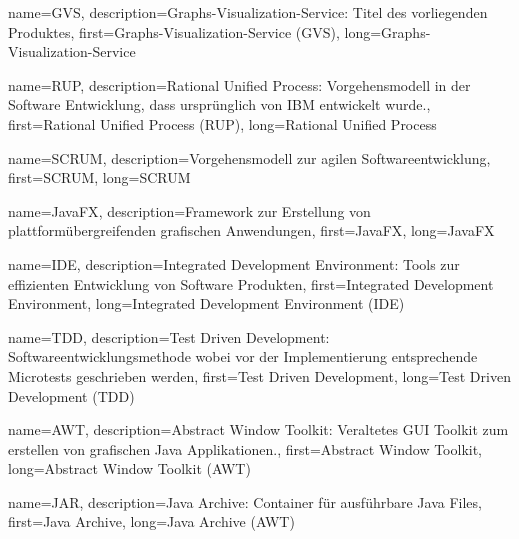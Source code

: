 



{
	name={GVS},
	description={Graphs-Visualization-Service: Titel des vorliegenden Produktes},
	first={Graphs-Visualization-Service (GVS)},
	long={Graphs-Visualization-Service}
}

{
	name={RUP},
	description={Rational Unified Process: Vorgehensmodell in der Software Entwicklung, dass ursprünglich von IBM entwickelt wurde.},
	first={Rational Unified Process (RUP)},
	long={Rational Unified Process}
}

{
	name={SCRUM},
	description={Vorgehensmodell zur agilen Softwareentwicklung},
	first={SCRUM},
	long={SCRUM}
}

{
	name={JavaFX},
	description={Framework zur Erstellung von plattformübergreifenden grafischen Anwendungen},
	first={JavaFX},
	long={JavaFX}
}

{
	name={IDE},
	description={Integrated Development Environment: Tools zur effizienten Entwicklung von Software Produkten},
	first={Integrated Development Environment},
	long={Integrated Development Environment (IDE)}
}

{
	name={TDD},
	description={Test Driven Development: Softwareentwicklungsmethode wobei vor der Implementierung entsprechende Microtests geschrieben werden},
	first={Test Driven Development},
	long={Test Driven Development (TDD)}
}

{
	name={AWT},
	description={Abstract Window Toolkit: Veraltetes GUI Toolkit zum erstellen von grafischen Java Applikationen.},
	first={Abstract Window Toolkit},
	long={Abstract Window Toolkit (AWT)}
}

{
	name={JAR},
	description={Java Archive: Container für ausführbare Java Files},
	first={Java Archive},
	long={Java Archive (AWT)}
}


